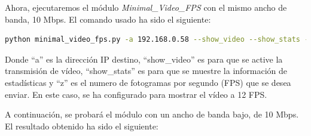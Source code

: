 \newpage

Ahora, ejecutaremos el módulo \textit{Minimal\_Video\_FPS} con el mismo ancho de banda, 10 Mbps. El comando usado ha sido el siguiente:
\begin{lstlisting}[language=bash, basicstyle=\ttfamily\scriptsize]
    python minimal_video_fps.py -a 192.168.0.58 --show_video --show_stats -z 12
\end{lstlisting}
Donde ``a'' es la dirección IP destino, ``show\_video'' es para que se active la transmisión de vídeo, ``show\_stats'' es para que se muestre la información de estadísticas y ``z'' es el numero de fotogramas por segundo (FPS) que se desea enviar. En este caso, se ha configurado para mostrar el vídeo a 12 FPS.

A continuación, se probará el módulo con un ancho de banda bajo, de 10 Mbps. El resultado obtenido ha sido el siguiente:
\vspace{\baselineskip}

